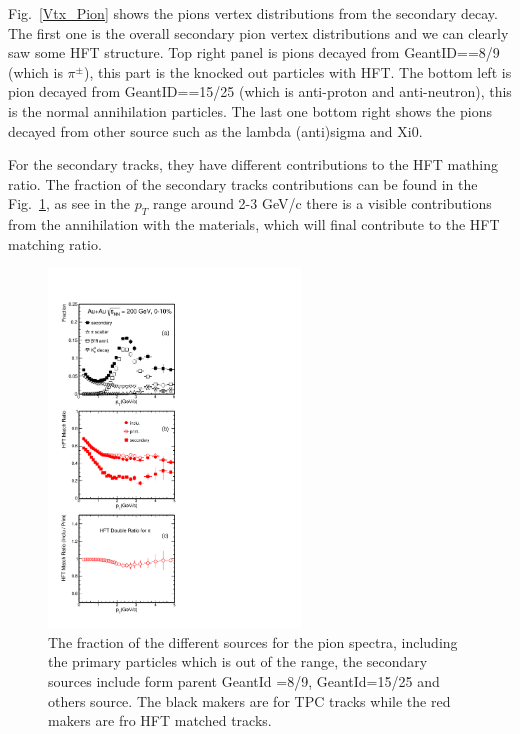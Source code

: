 Fig.~\ref{Vtx_Pion} shows the pions vertex distributions from the secondary decay. The first one is the overall secondary pion vertex distributions and we can clearly saw some HFT structure. Top right panel is pions decayed from GeantID==8/9 (which is $\pi^{\pm}$), this part is the knocked out particles with HFT. The bottom left is pion decayed from GeantID==15/25 (which is anti-proton and anti-neutron), this is the normal annihilation particles. The last one bottom right shows the pions decayed from other source such as the lambda (anti)sigma and Xi0.

For the secondary tracks, they have different contributions to the HFT mathing ratio. The fraction of the secondary tracks contributions can be found in the Fig.~\ref{Fraction_Pion}, as see in the $p_{T}$ range around 2-3 GeV/c there is a visible contributions from the annihilation with the materials, which will final contribute to the HFT matching ratio.

\begin{figure}[htbp]
\centering
\includegraphics[keepaspectratio,width=0.6\textwidth,angle=0]{figure/Run14_D0HFT/Fraction_Pion.pdf}
\caption{The fraction of the different sources for the pion spectra, including the primary particles which is out of the range, the secondary sources include form parent GeantId =8/9, GeantId=15/25 and others source. The black makers are for TPC tracks while the red makers are fro HFT matched tracks.}
\label{Fraction_Pion}
\end{figure}

